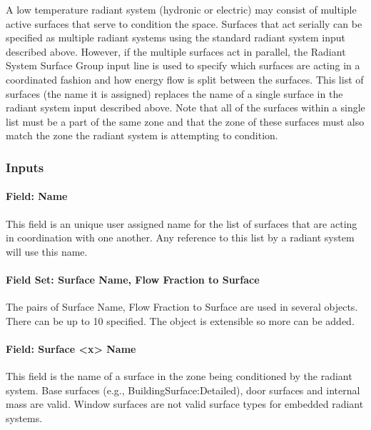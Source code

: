 A low temperature radiant system (hydronic or electric) may consist of multiple active surfaces that serve to condition the space. Surfaces that act serially can be specified as multiple radiant systems using the standard radiant system input described above. However, if the multiple surfaces act in parallel, the Radiant System Surface Group input line is used to specify which surfaces are acting in a coordinated fashion and how energy flow is split between the surfaces. This list of surfaces (the name it is assigned) replaces the name of a single surface in the radiant system input described above. Note that all of the surfaces within a single list must be a part of the same zone and that the zone of these surfaces must also match the zone the radiant system is attempting to condition.

\subsubsection{Inputs}\label{inputs-8-017}

\paragraph{Field: Name}\label{field-name-8-015}

This field is an unique user assigned name for the list of surfaces that are acting in coordination with one another. Any reference to this list by a radiant system will use this name.

\paragraph{Field Set: Surface Name, Flow Fraction to Surface}\label{field-set-surface-name-flow-fraction-to-surface}

The pairs of Surface Name, Flow Fraction to Surface are used in several objects. There can be up to 10 specified. The object is extensible so more can be added.

\paragraph{Field: Surface \textless{}x\textgreater{} Name}\label{field-surface-x-name-2}

This field is the name of a surface in the zone being conditioned by the radiant system. Base surfaces (e.g., BuildingSurface:Detailed), door surfaces and internal mass are valid. Window surfaces are not valid surface types for embedded radiant systems.

